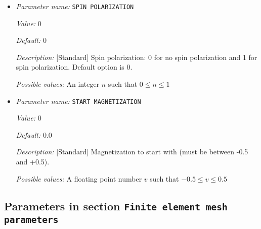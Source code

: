 \begin{itemize}
{\it Possible values:} An integer $n$ such that $1\leq n \leq 2$
\item {\it Parameter name:} {\tt SPIN POLARIZATION}
\label{parameters:DFT functional related parameters/SPIN POLARIZATION}
\label{parameters:DFT_20functional_20related_20parameters/SPIN_20POLARIZATION}


{\it Value:} 0


{\it Default:} 0


{\it Description:} [Standard] Spin polarization: 0 for no spin polarization and 1 for spin polarization. Default option is 0.


{\it Possible values:} An integer $n$ such that $0\leq n \leq 1$
\item {\it Parameter name:} {\tt START MAGNETIZATION}
\label{parameters:DFT functional related parameters/START MAGNETIZATION}
\label{parameters:DFT_20functional_20related_20parameters/START_20MAGNETIZATION}


{\it Value:} 0


{\it Default:} 0.0


{\it Description:} [Standard] Magnetization to start with (must be between -0.5 and +0.5).


{\it Possible values:} A floating point number $v$ such that $-0.5 \leq v \leq 0.5$
\end{itemize}

\subsection{Parameters in section \tt Finite element mesh parameters}
\label{parameters:Finite_20element_20mesh_20parameters}

